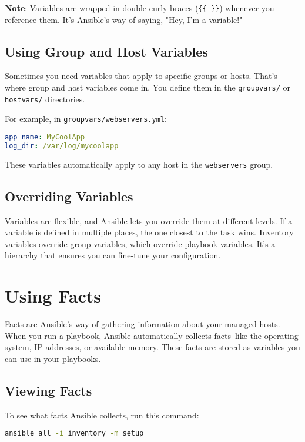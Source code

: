 \textbf{Note}: Variables are wrapped in double curly braces (\verb|{{ }}|) whenever you reference them. It's Ansible's way of saying, "Hey, I'm a variable!"

\subsection{Using Group and Host Variables}

Sometimes you need variables that apply to specific groups or hosts. That's where group and host variables come in. You define them in the \texttt{group\textunderscore vars/} or \texttt{host\textunderscore vars/} directories.

For example, in \texttt{group\textunderscore vars/webservers.yml}:
\begin{lstlisting}[language=yaml, caption=Group Variables]
app_name: MyCoolApp
log_dir: /var/log/mycoolapp
\end{lstlisting}

These va\textbf{r}iables automatically apply to any host in the \texttt{webservers} group.

\subsection{Overriding Variables}

Variables are flexible, and Ansible lets you override them at different levels. If a variable is defined in multiple places, the one closest to the task wins. \textbf{I}nventory variables override group variables, which override playbook variables. It's a hierarchy that ensures you can fine-tune your configuration.


\section{Using Facts}

Facts are Ansible's way of gathering information about your managed hosts. When you run a playbook, Ansible automatically collects facts--like the operating system, IP addresses, or available memory. These facts are stored as variables you can use in your playbooks.

\subsection{Viewing Facts}

To see what facts Ansible collects, run this command:
\begin{lstlisting}[language=bash, caption=Viewing Host Facts]
ansible all -i inventory -m setup
\end{lstlisting}

